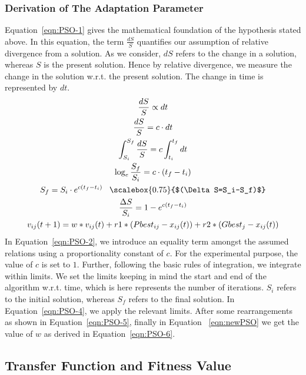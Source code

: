 \documentclass[final,3p,times]{elsarticle}
\newcommand*{\Scale}[2][4]{\scalebox{#1}{$#2$}}\usepackage{multirow}
\begin{document}
\subsubsection{Derivation of The Adaptation Parameter}
{Equation~\ref{eqn:PSO-1} gives the mathematical foundation of the hypothesis stated above. In this equation, the term $\frac{dS}{S}$ quantifies our assumption of relative divergence from a solution. {As we consider,} $dS$ refers to the change in a solution, whereas $S$ is the present {solution. Hence} by relative {divergence,} we measure the change in the solution w.r.t. the present solution. The change in time is represented by $dt$.}
\begin{gather}
    \label{eqn:PSO-1}
    \frac{dS}{S} \propto dt\\
    \label{eqn:PSO-2}
    \frac{dS}{S}=c\cdot dt\\
    \label{eqn:PSO-3}
    \int_{S_i}^{S_f} \frac{dS}{S}=c\int_{t_i}^{t_f} dt\\
    \label{eqn:PSO-4}
    \log_e {\frac{S_f}{S_i}} = c \cdot (t_f-t_i)\\
    \label{eqn:PSO-5}
    S_f = S_i\cdot e^{c(t_f-t_i)} \;\;\; \Scale[0.75]{(\Delta S=S_i-S_f)} \\
    \label{eqn:PSO-6}
    \frac{\Delta S}{S_i}= 1-e^{c(t_f-t_i)}\\
    \label{eqn:newPSO}{
    v_{ij}(t+1)=w*v_{ij}(t)+r1*(Pbest_{ij}-x_{ij}(t))+r2*(Gbest_{j}-x_{ij}(t))}
\end{gather}
{In Equation~\ref{eqn:PSO-2}, we introduce an equality term amongst the assumed {relations} using a proportionality constant of $c$. For the experimental purpose, the value of $c$ is set to $1$. Further, following the basic rules of integration, we integrate within {limits. We set the limits} keeping in mind the start and end of the algorithm w.r.t. time, {which is here} represents the number of iterations. $S_i$ refers to the initial solution, whereas $S_f$ refers to the final solution. In Equation~\ref{eqn:PSO-4}, we apply the relevant limits. After some rearrangements as shown in Equation~\ref{eqn:PSO-5}, finally in Equation ~\ref{eqn:newPSO} we get the value of $w$ as derived in Equation~\ref{eqn:PSO-6}.}
\subsection{Transfer Function and Fitness Value}
\end{document}
